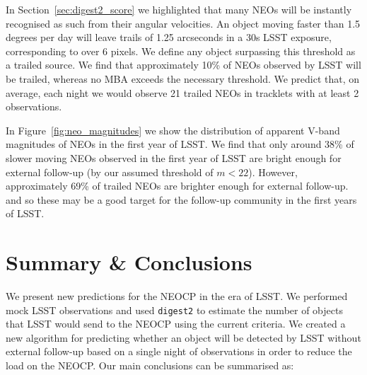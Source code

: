 \documentclass[twocolumn]{aastex631}
\newcommand{\dig}{\texttt{digest2}}
\begin{document}
In Section~\ref{sec:digest2_score} we highlighted that many NEOs will be instantly recognised as such from their angular velocities. An object moving faster than 1.5 degrees per day will leave trails of 1.25 arcseconds in a 30s LSST exposure, corresponding to over 6 pixels. We define any object surpassing this threshold as a trailed source. We find that approximately 10\% of NEOs observed by LSST will be trailed, whereas no MBA exceeds the necessary threshold. We predict that, on average, each night we would observe 21 trailed NEOs in tracklets with at least 2 observations.

In Figure~\ref{fig:neo_magnitudes} we show the distribution of apparent V-band magnitudes of NEOs in the first year of LSST. We find that only around 38\% of slower moving NEOs observed in the first year of LSST are bright enough for external follow-up (by our assumed threshold of $m < 22$). However, approximately 69\% of trailed NEOs are brighter enough for external follow-up.  and so these may be a good target for the follow-up community in the first years of LSST.

\section{Summary \& Conclusions} \label{sec:conclusion}
We present new predictions for the NEOCP in the era of LSST. We performed mock LSST observations and used \dig{} to estimate the number of objects that LSST would send to the NEOCP using the current criteria. We created a new algorithm for predicting whether an object will be detected by LSST without external follow-up based on a single night of observations in order to reduce the load on the NEOCP. Our main conclusions can be summarised as:
\end{document}
